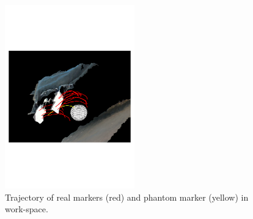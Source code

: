 \documentclass[letterpaper, 10 pt, conference]{ieeeconf}  %
\begin{document}
 \begin{figure}[thpb]
        \centering
        \includegraphics[trim={0 9cm 0 9cm},clip,width=0.5\textwidth]{figures/path/path55.pdf}
        \caption{Trajectory of real markers (red) and phantom marker (yellow) in work-space.}
        \label{fig:work}
\end{figure}
\end{document}
